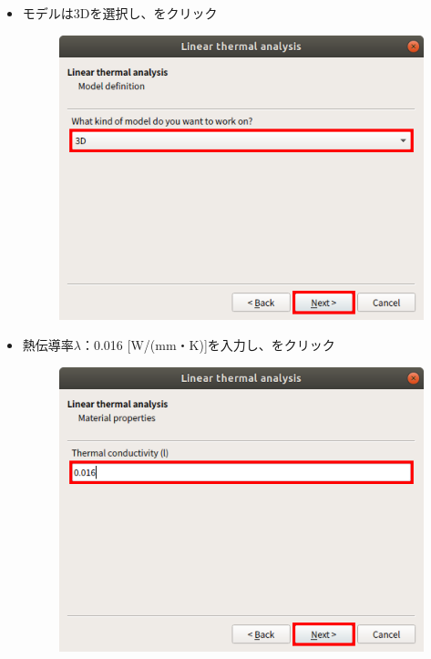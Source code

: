 \begin{itemize}
\begin{figure}[H]
	      \end{figure}
	      \clearpage
	\item モデルは3Dを選択し、をクリック
	      \begin{figure}[H]
		      \centering
		      \includegraphics{fig/Assisant_thermal_003.png}
	      \end{figure}
	      \clearpage
	\item 熱伝導率$\lambda$：0.016 [W/(mm・K)]を入力し、をクリック
	      \begin{figure}[H]
		      \centering
		      \includegraphics{fig/Assisant_thermal_004.png}

\end{figure}
\end{itemize}
